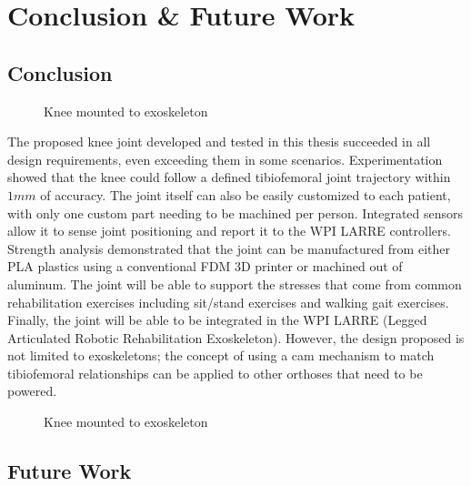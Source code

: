 \chapter{Conclusion \& Future Work}

\section{Conclusion}

\begin{figure}[ht!]
    \centering
    \caption{Knee mounted to exoskeleton}
    \label{fig:KneeJointPicture}
\end{figure}

The proposed knee joint developed and tested in this thesis succeeded in all design requirements, even exceeding them in some scenarios. Experimentation showed that the knee could follow a defined tibiofemoral joint trajectory within \(1mm\) of accuracy. The joint itself can also be easily customized to each patient, with only one custom part needing to be machined per person. Integrated sensors allow it to sense joint positioning and report it to the WPI LARRE controllers. Strength analysis demonstrated that the joint can be manufactured from either PLA plastics using a conventional FDM 3D printer or machined out of aluminum. The joint will be able to support the stresses that come from common rehabilitation exercises including sit/stand exercises and walking gait exercises. Finally, the joint will be able to be integrated in the WPI LARRE (Legged Articulated Robotic Rehabilitation Exoskeleton). However, the design proposed is not limited to exoskeletons; the concept of using a cam mechanism to match tibiofemoral relationships can be applied to other orthoses that need to be powered.

\begin{figure}[ht!]
    \centering
    \caption{Knee mounted to exoskeleton}
    \label{fig:KneeOnExo}
\end{figure}


\section{Future Work}



